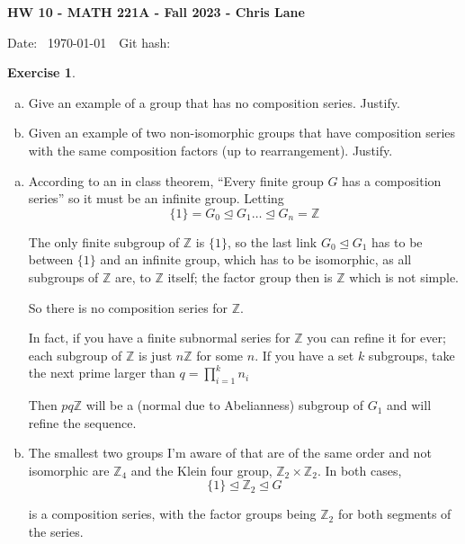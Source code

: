 \documentclass[11pt,oneside]{article}
\numberwithin{equation}{section}
\theoremstyle{definition}
\newtheorem{exercise}{Exercise}
\def\ZZ{\mathbb{Z}}
\begin{document}
\textbf{HW 10 - MATH 221A - Fall 2023 - Chris Lane}

Date: \hhmmsstime{} \ \today \ \ Git hash: 


\begin{exercise}
  \begin{enumerate}[(a)]
  \item
    Give an example of a group that has no composition series.  Justify.
  \item
    Given an example of two non-isomorphic groups that have composition series with the same
    composition factors (up to rearrangement).  Justify.  
  \end{enumerate}
\end{exercise}
  
\begin{solution}
  \begin{enumerate}[(a)]
  \item
    According to an in class theorem, ``Every finite group $G$ has a composition series'' so
    it must be an infinite group.  Letting
    \[
      \{1\} = G_0 \trianglelefteq G_1 \hdots  \trianglelefteq G_n = \ZZ
    \]

    The only finite subgroup of $\ZZ$ is $\{ 1 \}$, so the last link
    $G_0 \trianglelefteq G_1$ has to be between $\{ 1 \}$ and an
  infinite group, which has to be isomorphic, as all subgroups of $\ZZ$
  are, to $\ZZ$ itself; the factor group then is $\ZZ$ which is not
  simple.

  So there is no composition series for $\ZZ$.

  In fact, if you have a finite subnormal series for $\ZZ$ you can
  refine it for ever; each subgroup of $\ZZ$ is just $n\ZZ$ for some
  $n$.  If you have a set $k$ subgroups, take the next prime larger
  than $ q = \prod \limits _ {i=1} ^ k n_i $

  Then $ p q \ZZ$ will be a (normal due to Abelianness) subgroup of $G_1$ and
  will refine the sequence.
    
\item
  The smallest two groups I'm aware of that are of the same order
  and not isomorphic are $\ZZ_4$ and the Klein four group, $\ZZ_2 \times \ZZ_2$.  In both cases,
  \[
    \{ 1 \} \trianglelefteq \ZZ_2 \trianglelefteq G
  \]

  is a composition series, with the factor groups being $\ZZ_2$ for
  both segments of the series.
    
  \end{enumerate}
\end{solution}
\end{document}
